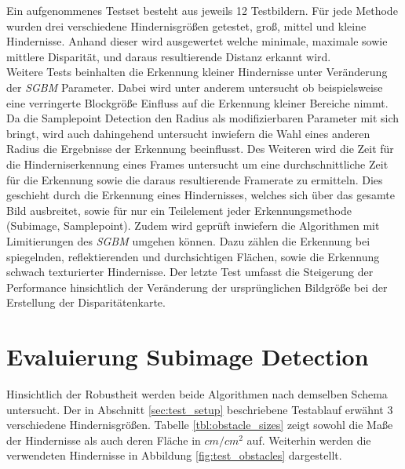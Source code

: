 \noindent
Ein aufgenommenes Testset besteht aus jeweils 12 Testbildern. Für jede Methode wurden drei verschiedene Hindernisgrößen getestet, groß, mittel und kleine Hindernisse. Anhand dieser wird ausgewertet welche minimale, maximale sowie mittlere Disparität, und daraus resultierende Distanz erkannt wird.\\

\noindent
Weitere Tests beinhalten die Erkennung kleiner Hindernisse unter Veränderung der \emph{SGBM} Parameter. Dabei wird unter anderem untersucht ob beispielsweise eine verringerte Blockgröße Einfluss auf die Erkennung kleiner Bereiche nimmt. Da die Samplepoint Detection den Radius als modifizierbaren Parameter mit sich bringt, wird auch dahingehend untersucht inwiefern die Wahl eines anderen Radius die Ergebnisse der Erkennung beeinflusst. Des Weiteren wird die Zeit für die Hinderniserkennung eines Frames untersucht um eine durchschnittliche Zeit für die Erkennung sowie die daraus resultierende Framerate zu ermitteln. Dies geschieht durch die Erkennung eines Hindernisses, welches sich über das gesamte Bild ausbreitet, sowie für nur ein Teilelement jeder Erkennungsmethode (Subimage, Samplepoint). Zudem wird geprüft inwiefern die Algorithmen mit Limitierungen des \emph{SGBM} umgehen können. Dazu zählen die Erkennung bei spiegelnden, reflektierenden und durchsichtigen Flächen, sowie die Erkennung schwach texturierter Hindernisse. Der letzte Test umfasst die Steigerung der Performance hinsichtlich der Veränderung der ursprünglichen Bildgröße bei der Erstellung der Disparitätenkarte.\\


\section{Evaluierung Subimage Detection}
\label{sec:evaluierung_subimage}

Hinsichtlich der Robustheit werden beide Algorithmen nach demselben Schema untersucht. Der in Abschnitt \ref{sec:test_setup} beschriebene Testablauf erwähnt 3 verschiedene Hindernisgrößen. Tabelle \ref{tbl:obstacle_sizes} zeigt sowohl die Maße der Hindernisse als auch deren Fläche in $cm/cm^2$ auf. Weiterhin werden die verwendeten Hindernisse in Abbildung \ref{fig:test_obstacles} dargestellt.

